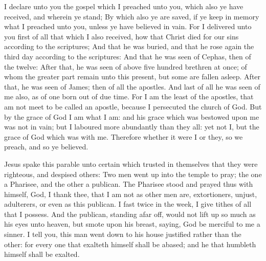  I declare unto you the gospel which I preached unto you, which also ye have received, and wherein ye stand; By which also ye are saved, if ye keep in memory what I preached unto you, unless ye have believed in vain. For I delivered unto you first of all that which I also received, how that Christ died for our sins according to the scriptures; And that he was buried, and that he rose again the third day according to the scriptures: And that he was seen of Cephas, then of the twelve: After that, he was seen of above five hundred brethren at once; of whom the greater part remain unto this present, but some are fallen asleep. After that, he was seen of James; then of all the apostles. And last of all he was seen of me also, as of one born out of due time. For I am the least of the apostles, that am not meet to be called an apostle, because I persecuted the church of God. But by the grace of God I am what I am: and his grace which was bestowed upon me was not in vain; but I laboured more abundantly than they all: yet not I, but the grace of God which was with me. Therefore whether it were I or they, so we preach, and so ye believed.


 Jesus spake this parable unto certain which trusted in themselves that they were righteous, and despised others: Two men went up into the temple to pray; the one a Pharisee, and the other a publican. The Pharisee stood and prayed thus with himself, God, I thank thee, that I am not as other men are, extortioners, unjust, adulterers, or even as this publican. I fast twice in the week, I give tithes of all that I possess. And the publican, standing afar off, would not lift up so much as his eyes unto heaven, but smote upon his breast, saying, God be merciful to me a sinner. I tell you, this man went down to his house justified rather than the other: for every one that exalteth himself shall be abased; and he that humbleth himself shall be exalted.


